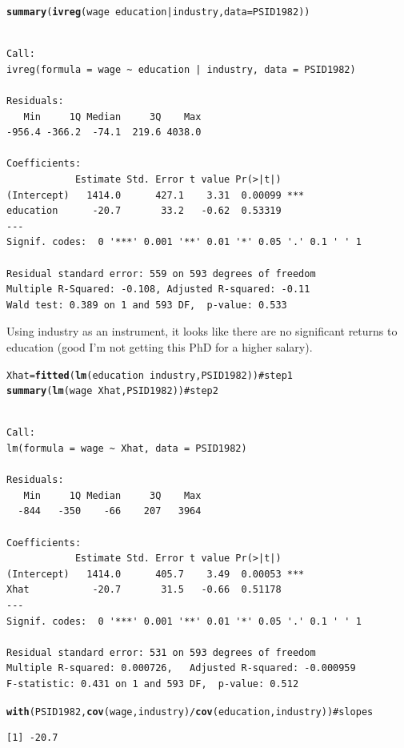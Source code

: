 \documentclass{article}\usepackage{graphicx, color}
\makeatletter
\newcommand{\hlfunctioncall}[1]{\textcolor[rgb]{0.501960784313725,0,0.329411764705882}{\textbf{#1}}}%
\newcommand{\hlcomment}[1]{\textcolor[rgb]{0.180392156862745,0.6,0.341176470588235}{#1}}%
\newenvironment{kframe}{%
 \def\at@end@of@kframe{}%
 \ifinner\ifhmode%
  \def\at@end@of@kframe{\end{minipage}}%
  \begin{minipage}{\columnwidth}%
 \fi\fi%
 \def\FrameCommand##1{\hskip\@totalleftmargin \hskip-\fboxsep
 \colorbox{shadecolor}{##1}\hskip-\fboxsep
     \hskip-\linewidth \hskip-\@totalleftmargin \hskip\columnwidth}%
 \MakeFramed {\advance\hsize-\width
   \@totalleftmargin\z@ \linewidth\hsize
   \@setminipage}}%
 {\par\unskip\endMakeFramed%
 \at@end@of@kframe}
\newenvironment{knitrout}{}{} %
\makeatother
\begin{document}
\begin{knitrout}
\color{fgcolor}\begin{kframe}
\begin{alltt}
\hlfunctioncall{summary}(\hlfunctioncall{ivreg}(wage~education|industry,data=PSID1982))
\end{alltt}
\begin{verbatim}

Call:
ivreg(formula = wage ~ education | industry, data = PSID1982)

Residuals:
   Min     1Q Median     3Q    Max 
-956.4 -366.2  -74.1  219.6 4038.0 

Coefficients:
            Estimate Std. Error t value Pr(>|t|)    
(Intercept)   1414.0      427.1    3.31  0.00099 ***
education      -20.7       33.2   -0.62  0.53319    
---
Signif. codes:  0 '***' 0.001 '**' 0.01 '*' 0.05 '.' 0.1 ' ' 1 

Residual standard error: 559 on 593 degrees of freedom
Multiple R-Squared: -0.108,	Adjusted R-squared: -0.11 
Wald test: 0.389 on 1 and 593 DF,  p-value: 0.533 

\end{verbatim}
\end{kframe}
\end{knitrout}

Using industry as an instrument, it looks like there are no significant returns to education (good I'm not getting this PhD for a higher salary).
\begin{knitrout}
\color{fgcolor}\begin{kframe}
\begin{alltt}
Xhat=\hlfunctioncall{fitted}(\hlfunctioncall{lm}(education~industry,PSID1982)) \hlcomment{#step 1}
\hlfunctioncall{summary}(\hlfunctioncall{lm}(wage~Xhat,PSID1982)) \hlcomment{#step 2}
\end{alltt}
\begin{verbatim}

Call:
lm(formula = wage ~ Xhat, data = PSID1982)

Residuals:
   Min     1Q Median     3Q    Max 
  -844   -350    -66    207   3964 

Coefficients:
            Estimate Std. Error t value Pr(>|t|)    
(Intercept)   1414.0      405.7    3.49  0.00053 ***
Xhat           -20.7       31.5   -0.66  0.51178    
---
Signif. codes:  0 '***' 0.001 '**' 0.01 '*' 0.05 '.' 0.1 ' ' 1 

Residual standard error: 531 on 593 degrees of freedom
Multiple R-squared: 0.000726,	Adjusted R-squared: -0.000959 
F-statistic: 0.431 on 1 and 593 DF,  p-value: 0.512 

\end{verbatim}
\begin{alltt}
\hlfunctioncall{with}(PSID1982, \hlfunctioncall{cov}(wage,industry)/\hlfunctioncall{cov}(education,industry)) \hlcomment{#slopes}
\end{alltt}
\begin{verbatim}
[1] -20.7
\end{verbatim}
\end{kframe}
\end{knitrout}
\end{document}
